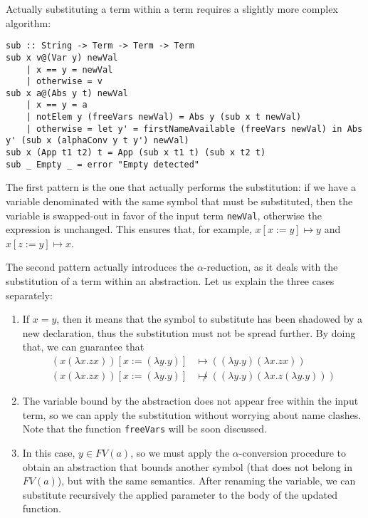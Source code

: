 \documentclass{article}
\begin{document}
Actually substituting a term within a term requires a slightly more complex algorithm:

\begin{lstlisting}
sub :: String -> Term -> Term -> Term
sub x v@(Var y) newVal
    | x == y = newVal
    | otherwise = v
sub x a@(Abs y t) newVal
    | x == y = a
    | notElem y (freeVars newVal) = Abs y (sub x t newVal)
    | otherwise = let y' = firstNameAvailable (freeVars newVal) in Abs y' (sub x (alphaConv y t y') newVal)
sub x (App t1 t2) t = App (sub x t1 t) (sub x t2 t)
sub _ Empty _ = error "Empty detected"
\end{lstlisting}

The first pattern is the one that actually performs the substitution: if we have a variable denominated with the same symbol that must be substituted, then the variable is swapped-out in favor of the input term \lstinline|newVal|, otherwise the expression is unchanged. This ensures that, for example, $x[x:=y] \mapsto y$ and $x[z:=y] \mapsto x$.

The second pattern actually introduces the $\alpha$-reduction, as it deals with the substitution of a term within an abstraction. Let us explain the three cases separately:

\begin{enumerate}
    \item If $x=y$, then it means that the symbol to substitute has been shadowed by a new declaration, thus the substitution must not be spread further. By doing that, we can guarantee that
    \begin{align*}
        (x (\lambda x . z x))[x := (\lambda y . y)] &\mapsto ((\lambda y . y) (\lambda x . z x))\\
        (x (\lambda x . z x))[x := (\lambda y . y)] &\not \mapsto ((\lambda y . y) (\lambda x . z (\lambda y . y)))
    \end{align*}
    \item The variable bound by the abstraction does not appear free within the input term, so we can apply the substitution without worrying about name clashes. Note that the function \lstinline|freeVars| will be soon discussed.
    \item In this case, $y \in FV(a)$, so we must apply the $\alpha$-conversion procedure to obtain an abstraction that bounds another symbol (that does not belong in $FV(a)$), but with the same semantics. After renaming the variable, we can substitute recursively the applied parameter to the body of the updated function.
\end{enumerate}
\end{document}
